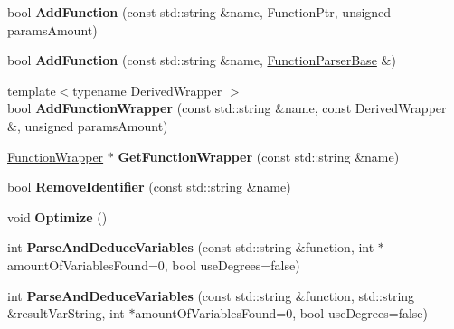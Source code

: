 \begin{DoxyCompactItemize}
\item 
\mbox{\label{class_function_parser_base_a3ce10f1ba66ab8b2682acf0db0b65254}} 
bool {\bfseries Add\+Function} (const std\+::string \&name, Function\+Ptr, unsigned params\+Amount)
\item 
\mbox{\label{class_function_parser_base_aa4925ed099b1708d0690457c414cb386}} 
bool {\bfseries Add\+Function} (const std\+::string \&name, \hyperlink{class_function_parser_base}{Function\+Parser\+Base} \&)
\item 
\mbox{\label{class_function_parser_base_a2193385ed0850c8124895fa50255bd6b}} 
{\footnotesize template$<$typename Derived\+Wrapper $>$ }\\bool {\bfseries Add\+Function\+Wrapper} (const std\+::string \&name, const Derived\+Wrapper \&, unsigned params\+Amount)
\item 
\mbox{\label{class_function_parser_base_a817de51bc1c502df38e14484d4e15140}} 
\hyperlink{class_function_parser_base_1_1_function_wrapper}{Function\+Wrapper} $\ast$ {\bfseries Get\+Function\+Wrapper} (const std\+::string \&name)
\item 
\mbox{\label{class_function_parser_base_ab8b553d924e2940b8ee3cc00fbd11d10}} 
bool {\bfseries Remove\+Identifier} (const std\+::string \&name)
\item 
\mbox{\label{class_function_parser_base_af25c430d7834d7d1e43b8da5ebaaf382}} 
void {\bfseries Optimize} ()
\item 
\mbox{\label{class_function_parser_base_af9911ae70fa2ad7a9b72c83c2b04e371}} 
int {\bfseries Parse\+And\+Deduce\+Variables} (const std\+::string \&function, int $\ast$amount\+Of\+Variables\+Found=0, bool use\+Degrees=false)
\item 
\mbox{\label{class_function_parser_base_a358732851be21c0a4d7391fe121c24e6}} 
int {\bfseries Parse\+And\+Deduce\+Variables} (const std\+::string \&function, std\+::string \&result\+Var\+String, int $\ast$amount\+Of\+Variables\+Found=0, bool use\+Degrees=false)

\end{DoxyCompactItemize}

